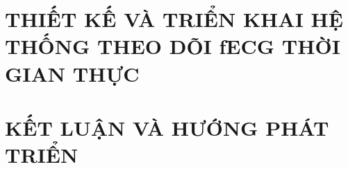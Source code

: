 \documentclass[a4paper,13pt,3p,twoside]{report}
\renewcommand{\bibname}{Danh_sach_tai_lieu_tham_khao}
\theoremstyle{definition}
\begin{document}
\newpage
\chapter{THIẾT KẾ VÀ TRIỂN KHAI HỆ THỐNG THEO DÕI fECG THỜI GIAN THỰC}
\label{chapter:System}


\newpage
\chapter{KẾT LUẬN VÀ HƯỚNG PHÁT TRIỂN}
\label{chapter:Conclusion}


\newpage
\renewcommand\bibname{TÀI LIỆU THAM KHẢO}
\printbibliography
{}




% 
% 
\end{document}
